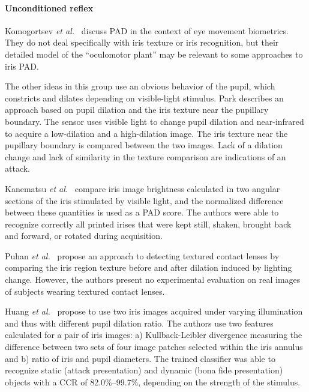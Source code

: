\documentclass[format=acmsmall, review=false, timestamp=false]{acmart}
\newcommand{\etal}{{\it et al.}~}
\begin{document}
\paragraph{Unconditioned reflex}

Komogortsev \etal 
\cite{Komogortsev_ICB_2013, Komogortsev_TIFS_2015} discuss PAD in the context of eye movement biometrics. They do not deal  specifically with iris texture or iris recognition, but their detailed model of the ``oculomotor plant'' may be relevant to some approaches to iris PAD.

The other ideas in this group use an obvious {behavior} of the pupil, which constricts and dilates depending on visible-light stimulus. Park \cite{Park_AMDO_2006} describes an approach based on pupil dilation and the iris texture near the pupillary boundary. The sensor uses visible light to change pupil dilation and near-{infrared} to acquire a low-dilation and a high-dilation image. The iris texture near the pupillary boundary is compared between the two images. Lack of a dilation change and lack of similarity in the texture comparison are indications of an attack.

Kanematsu \etal \cite{Kanematsu_SICE_2007} compare iris image brightness calculated in {two angular sections} of the iris stimulated by visible light, and the normalized difference between these quantities is used as a PAD score. The authors were able to recognize correctly all printed irises that were kept still, shaken, brought back and forward, or rotated during acquisition.

Puhan \etal \cite{Puhan_ISCE_2011} propose an approach to detecting textured contact lenses by comparing the iris region texture before and after dilation induced by lighting change. However, the authors present no experimental evaluation on real images of subjects wearing textured contact lenses. 

Huang \etal \cite{Huang_WACV_2013} propose to use two iris images acquired under varying illumination and thus with different pupil dilation ratio. The authors use two features calculated for a pair of iris images: a) Kullback-Leibler divergence measuring the difference between two sets of four image patches selected within the iris annulus and b) ratio of iris and pupil diameters. The trained classifier was able to recognize static (attack {presentation}) and dynamic (bona fide {presentation}) objects with {a CCR} of 82.0\%--99.7\%, depending on the strength of the stimulus. 
\end{document}
